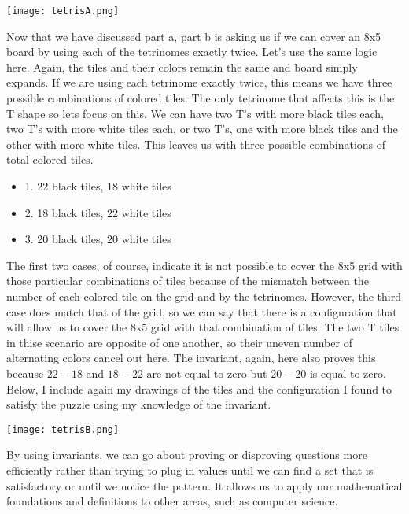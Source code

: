 \documentclass{article}
\theoremstyle{theorem}
\theoremstyle{definition}
\theoremstyle{remark}
\begin{document}
  \begin{center}
    \texttt{[image: tetrisA.png]}
  \end{center}


Now that we have discussed part a, part b is asking us if we can cover an 8x5 board by using each of the tetrinomes exactly twice. Let's use the same logic here. Again, the tiles and their colors remain the same and board simply expands. 
If we are using each tetrinome exactly twice, this means we have three possible combinations of colored tiles. The only tetrinome that affects this is the T shape so lets focus on this. We can have two T's with more black tiles each, two T's with more white tiles each, or 
two T's, one with more black tiles and the other with more white tiles. This leaves us with three possible combinations of total colored tiles. \\

\begin{itemize}
  \item[\ding{99}] 1. 22 black tiles, 18 white tiles 
  \item[\ding{99}] 2. 18 black tiles, 22 white tiles 
  \item[\ding{99}] 3. 20 black tiles, 20 white tiles
\end{itemize}

The first two cases, of course, indicate it is not possible to cover the 8x5 grid with those particular combinations of tiles because of the mismatch between the number of each colored tile on the grid and by the tetrinomes. However, the third case does match that of the grid, so we can say that there is a configuration that will allow us to cover the 8x5 grid with that 
combination of tiles. The two T tiles in thise scenario are opposite of one another, so their uneven number of alternating colors cancel out here. The invariant, again, here also proves this because $22-18$ and $18-22$ are not equal to zero but $20-20$ is equal to zero. Below, I include 
again my drawings of the tiles and the configuration I found to satisfy the puzzle using my knowledge of the invariant. \\

\begin{center}
  \texttt{[image: tetrisB.png]}
\end{center}

By using invariants, we can go about proving or disproving questions more efficiently rather than trying to plug in values until we can find a set that is satisfactory or until we notice the pattern. It allows us to apply our mathematical foundations and definitions to other areas, 
such as computer science. 
\end{document}
